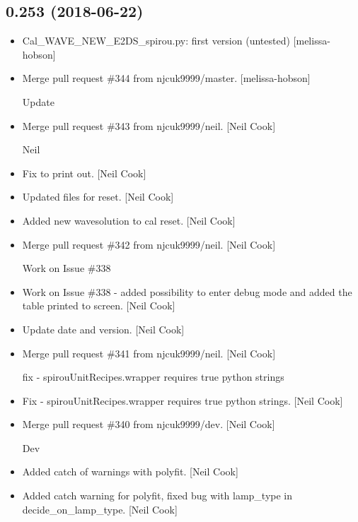 \documentclass[a4paper,10pt,english]{report}
\begin{document}
\subsection{0.253 (2018-06-22)}
\label{\detokenize{misc/changelog:id411}}\begin{itemize}
\item {} 
Cal\_WAVE\_NEW\_E2DS\_spirou.py: first version (untested) {[}melissa-hobson{]}

\item {} 
Merge pull request \#344 from njcuk9999/master. {[}melissa-hobson{]}

Update

\item {} 
Merge pull request \#343 from njcuk9999/neil. {[}Neil Cook{]}

Neil

\item {} 
Fix to print out. {[}Neil Cook{]}

\item {} 
Updated files for reset. {[}Neil Cook{]}

\item {} 
Added new wavesolution to cal reset. {[}Neil Cook{]}

\item {} 
Merge pull request \#342 from njcuk9999/neil. {[}Neil Cook{]}

Work on Issue \#338

\item {} 
Work on Issue \#338 - added possibility to enter debug mode and added
the table printed to screen. {[}Neil Cook{]}

\item {} 
Update date and version. {[}Neil Cook{]}

\item {} 
Merge pull request \#341 from njcuk9999/neil. {[}Neil Cook{]}

fix - spirouUnitRecipes.wrapper requires true python strings

\item {} 
Fix - spirouUnitRecipes.wrapper requires true python strings. {[}Neil
Cook{]}

\item {} 
Merge pull request \#340 from njcuk9999/dev. {[}Neil Cook{]}

Dev

\item {} 
Added catch of warnings with polyfit. {[}Neil Cook{]}

\item {} 
Added catch warning for polyfit, fixed bug with lamp\_type in
decide\_on\_lamp\_type. {[}Neil Cook{]}


\end{itemize}
\end{document}
